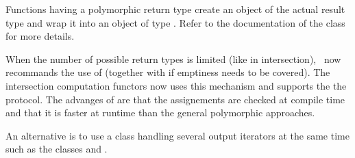 Functions having a polymorphic return type create an object of the actual
result type and wrap it into an object of type .
Refer to the documentation of the 
class for more details.

When the number of possible return types is limited (like in intersection), \cgal\ now recommands the use of
 (together with 
if emptiness needs to be covered). The intersection computation functors now uses this mechanism and supports the
the  protocol. The advanges of  are that
the assignements are checked at compile time and that it is faster at runtime than the general polymorphic approaches.

An alternative is to use a class handling several output iterators at the same time such as the classes
and
.
